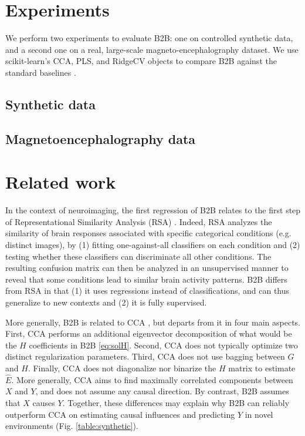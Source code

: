 \documentclass{article}
\begin{document}
\section{Experiments}

We perform two experiments to evaluate B2B: one on controlled synthetic data, and a second one on a real, large-scale magneto-encephalography dataset.
%
We use scikit-learn's CCA, PLS, and RidgeCV objects to compare B2B against the standard baselines \citep{sklearn}.

\subsection{Synthetic data}
\label{sec:experiment_synthetic}



\subsection{Magnetoencephalography data}
\label{sec:experiment_real}



\section{Related work}

In the context of neuroimaging, the first regression of B2B relates to the first step of Representational Similarity Analysis (RSA) \citep{kriegeskorte2008representational}. Indeed, RSA analyzes the similarity of brain responses associated with specific categorical conditions (e.g. distinct images), by (1) fitting one-against-all classifiers on each condition and (2) testing whether these classifiers can discriminate all other conditions. The resulting confusion matrix can then be analyzed in an unsupervised manner to reveal that some conditions lead to similar brain activity patterns. B2B differs from RSA in that (1) it uses regressions instead of classifications, and can thus generalize to new contexts and (2)
it is fully supervised.

More generally, B2B is related to CCA \citep{cca_hotelling}, but departs from it in four main aspects. First, CCA performs an additional eigenvector decomposition of what would be the $H$ coefficients in B2B \eqref{eq:solH}. Second, CCA does not typically optimize two distinct regularization parameters. Third, CCA does not use bagging between $G$ and $H$. Finally, CCA does not diagonalize nor binarize the $H$ matrix to estimate $\hat E$. More generally, CCA aims to find maximally correlated components between $X$ and $Y$, and does not assume any causal direction. By contrast, B2B assumes that $X$ causes $Y$. Together, these differences may explain why B2B can reliably outperform CCA on estimating causal influences and predicting $Y$ in novel environments (Fig. \ref{table:synthetic}).
\end{document}
